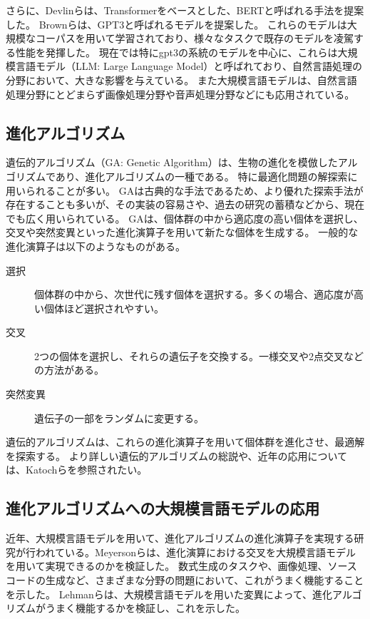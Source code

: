 \documentclass[a4paper,11pt]{jreport}
\begin{document}
さらに、Devlinら\cite{devlin2019bert}は、Transformerをベースとした、BERTと呼ばれる手法を提案した。
Brownら\cite{gpt3}は、GPT3と呼ばれるモデルを提案した。
これらのモデルは大規模なコーパスを用いて学習されており、様々なタスクで既存のモデルを凌駕する性能を発揮した。
現在では特にgpt3の系統のモデルを中心に、これらは大規模言語モデル（LLM: Large Language Model）と呼ばれており、自然言語処理の分野において、大きな影響を与えている。
また大規模言語モデルは、自然言語処理分野にとどまらず画像処理分野や音声処理分野などにも応用されている。

\subsection{進化アルゴリズム}

遺伝的アルゴリズム（GA: Genetic Algorithm）\cite{genetic-algorithm, vose1999simple}は、生物の進化を模倣したアルゴリズムであり、進化アルゴリズムの一種である。
特に最適化問題の解探索に用いられることが多い。
GAは古典的な手法であるため、より優れた探索手法が存在することも多いが、その実装の容易さや、過去の研究の蓄積などから、現在でも広く用いられている。
GAは、個体群の中から適応度の高い個体を選択し、交叉や突然変異といった進化演算子を用いて新たな個体を生成する。
一般的な進化演算子は以下のようなものがある。
\begin{description}
  \item[選択]
  個体群の中から、次世代に残す個体を選択する。多くの場合、適応度が高い個体ほど選択されやすい。
  \item[交叉] 2つの個体を選択し、それらの遺伝子を交換する。一様交叉や2点交叉などの方法がある。
  \item[突然変異] 遺伝子の一部をランダムに変更する。
\end{description}
遺伝的アルゴリズムは、これらの進化演算子を用いて個体群を進化させ、最適解を探索する。
より詳しい遺伝的アルゴリズムの総説や、近年の応用については、Katochら\cite{katoch2021review}を参照されたい。

\subsection{進化アルゴリズムへの大規模言語モデルの応用}

近年、大規模言語モデルを用いて、進化アルゴリズムの進化演算子を実現する研究が行われている。Meyersonら\cite{meyerson2023language}は、進化演算における交叉を大規模言語モデルを用いて実現できるのかを検証した。
数式生成のタスクや、画像処理、ソースコードの生成など、さまざまな分野の問題において、これがうまく機能することを示した。
Lehmanら\cite{lehman2022evolution}は、大規模言語モデルを用いた変異によって、進化アルゴリズムがうまく機能するかを検証し、これを示した。
\end{document}
